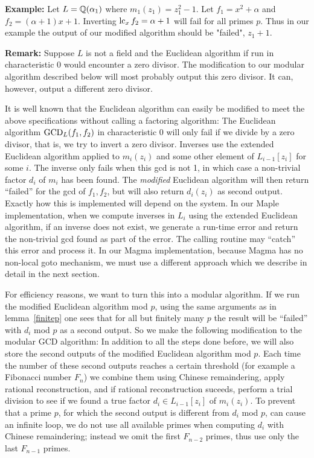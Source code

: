 \documentclass[10pt]{article}
\begin{document}
\noindent
{\bf Example:} Let $L = {\mathbb Q}(\alpha_1)$ where $m_1(z_1) = z_1^2-1$.
Let $f_1 = x^2 + \alpha$ and $f_2 = (\alpha+1) x + 1.$  Inverting
$\lc_x f_2 = \alpha+1$ will fail for all primes $p$.
Thus in our example the output of our modified algorithm
should be "failed", $z_1+1$.

\medskip
\noindent
{\bf Remark:}
Suppose $L$ is not a field and the Euclidean algorithm if run
in characteristic 0 would encounter a zero divisor.  The modification to
our modular algorithm described below will most probably output this zero
divisor.  It can, however, output a different zero divisor.

\medskip
\noindent
It is well known that the Euclidean algorithm can easily be modified
to meet the above specifications without calling a factoring algorithm:
The Euclidean algorithm ${\rm GCD}_L(f_1, f_2)$ in characteristic 0
will only fail if we divide by a zero divisor, that is, we try to
invert a zero divisor.  Inverses use the extended Euclidean algorithm
applied to $m_i(z_i)$ and some other element of $L_{i-1}[z_i]$ for some $i$.
The inverse only fails when this gcd is not 1, in which case a non-trivial
factor $d_i$ of $m_i$ has been found.  The {\em modified} Euclidean
algorithm will then return ``failed'' for the gcd of $f_1,f_2$,
but will also return $d_i(z_i)$ as second output.
Exactly how this is implemented will depend on the system.
In our Maple implementation, when we compute inverses in $L_i$ using
the extended Euclidean algorithm, if an inverse does not exist,
we generate a run-time error and return the non-trivial gcd
found as part of the error.
The calling routine may ``catch'' this error and process it.
In our Magma implementation, because Magma has no non-local goto
mechanism, we must use a different approach which we describe
in detail in the next section.

For efficiency reasons, we want to turn this into a modular algorithm.
If we run the modified Euclidean algorithm mod $p$,
using the same arguments as in lemma~\ref{finitep} one sees that for
all but finitely many $p$ the result will be ``failed'' with
$d_i$ mod $p$ as a second output.
So we make the following modification to the modular GCD algorithm:
In addition to all the steps done before, we will also store the
second outputs of the modified Euclidean algorithm mod $p$.
Each time the number of these second outputs reaches a certain threshold
(for example a Fibonacci number $F_n$) we combine them using Chinese remaindering,
apply rational reconstruction, and if rational reconstruction suceeds,
perform a trial division to see if we found a true factor $d_i \in L_{i-1}[z_i]$ of $m_i(z_i)$.
To prevent that a prime $p$, for which the second output is different
from $d_i$ mod $p$, can cause an infinite loop, we do not use
all available primes when computing $d_i$ with Chinese remaindering; instead
we omit the first $F_{n-2}$ primes, thus use only the last $F_{n-1}$ primes.
\end{document}
